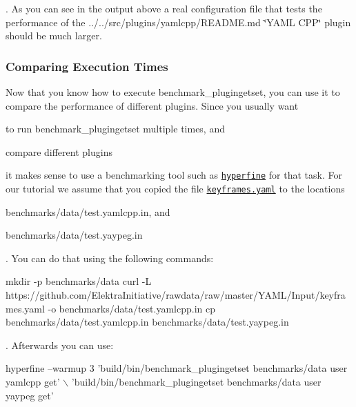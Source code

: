 . As you can see in the output above a real configuration file that tests the performance of the ../../src/plugins/yamlcpp/\+R\+E\+A\+D\+ME.md \char`\"{}\+Y\+A\+M\+L C\+P\+P\char`\"{} plugin should be much larger.

\subsubsection*{Comparing Execution Times}

Now that you know how to execute {\ttfamily benchmark\+\_\+plugingetset}, you can use it to compare the performance of different plugins. Since you usually want


\begin{DoxyItemize}
\item to run {\ttfamily benchmark\+\_\+plugingetset} multiple times, and
\item compare different plugins
\end{DoxyItemize}

it makes sense to use a benchmarking tool such as \href{https://github.com/sharkdp/hyperfine}{\tt hyperfine} for that task. For our tutorial we assume that you copied the file \href{https://github.com/ElektraInitiative/rawdata/blob/master/YAML/Input/keyframes.yaml}{\tt {\ttfamily keyframes.\+yaml}} to the locations


\begin{DoxyItemize}
\item {\ttfamily benchmarks/data/test.\+yamlcpp.\+in}, and
\item {\ttfamily benchmarks/data/test.\+yaypeg.\+in}
\end{DoxyItemize}

. You can do that using the following commands\+:


\begin{DoxyCode}
mkdir -p benchmarks/data
curl -L https://github.com/ElektraInitiative/rawdata/raw/master/YAML/Input/keyframes.yaml -o
       benchmarks/data/test.yamlcpp.in
cp benchmarks/data/test.yamlcpp.in benchmarks/data/test.yaypeg.in
\end{DoxyCode}


. Afterwards you can use\+:


\begin{DoxyCode}
hyperfine --warmup 3 'build/bin/benchmark\_plugingetset benchmarks/data user yamlcpp get' \(\backslash\)
                     'build/bin/benchmark\_plugingetset benchmarks/data user yaypeg get'
\end{DoxyCode}


